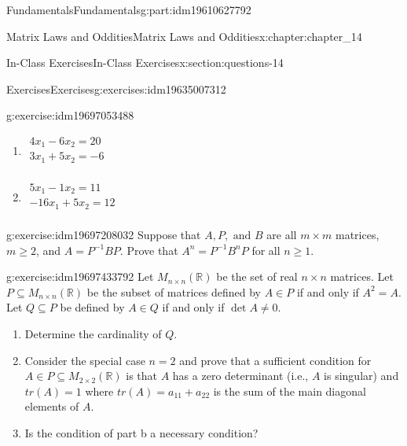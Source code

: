 \documentclass[oneside,10pt,]{book}
\numberwithin{equation}{section}
\begin{document}
\begin{partptx}{Fundamentals}{}{Fundamentals}{}{}{g:part:idm19610627792}
\begin{chapterptx}{Matrix Laws and Oddities}{}{Matrix Laws and Oddities}{}{}{x:chapter:chapter_14}
\begin{sectionptx}{In-Class Exercises}{}{In-Class Exercises}{}{}{x:section:questions-14}
\begin{exercises-subsection-numberless}{Exercises}{}{Exercises}{}{}{g:exercises:idm19635007312}
\begin{exercisegroup}
\begin{divisionexerciseeg}{2}{}{}{g:exercise:idm19697053488}
%
\begin{multicols}{2}
\begin{enumerate}[label=(\alph*)]
\item{}\(\displaystyle \begin{array}{c}4x_1-6x_2=20\\
3x_1+5x_2= -6\\
\end{array}\)%
\item{}\(\displaystyle \begin{array}{c}5x_1-1x_2= 11\\
-16x_1 +5x_2= 12\\
\end{array}\)%
\end{enumerate}
\end{multicols}
%
\end{divisionexerciseeg}%
\begin{divisionexerciseeg}{3}{}{}{g:exercise:idm19697208032}%
Suppose that \(A, P, \textrm{ and } B\) are all \(m \times m\) matrices, \(m \geq 2\), and \(A= P^{-1} B P\). Prove that  \(A^n = P^{-1} B^n P\) for all \(n \geq 1\).%
\end{divisionexerciseeg}%
\begin{divisionexerciseeg}{4}{}{}{g:exercise:idm19697433792}%
Let \(M_{n\times n}(\mathbb{R})\) be the set of real \(n\times n\) matrices. Let \(P \subseteq  M_{n\times n}(\mathbb{R})\) be the subset of matrices defined by \(A \in  P\) if and only if \(A^2 = A\). Let \(Q \subseteq  P\) be defined by \(A\in Q\) if and only if \(\det A \neq  0\).%
\par
%
\begin{enumerate}[label=(\alph*)]
\item{}Determine the cardinality of \(Q\).%
\item{}Consider the special case \(n = 2\) and prove that a sufficient condition for \(A \in  P \subseteq  M_{2\times 2}(\mathbb{R})\) is that \(A\) has a zero determinant (i.e., \(A\) is singular) and \(tr(A) = 1\) where \(tr(A) = a_{11}+ a _{22}\) is the sum of the main diagonal elements of \(A\).%
\item{}Is the condition of part b a necessary condition?%
\end{enumerate}
%
\end{divisionexerciseeg}%
\end{exercisegroup}
\par\medskip\noindent
\end{exercises-subsection-numberless}
\end{sectionptx}

\end{chapterptx}
\end{partptx}
\end{document}
